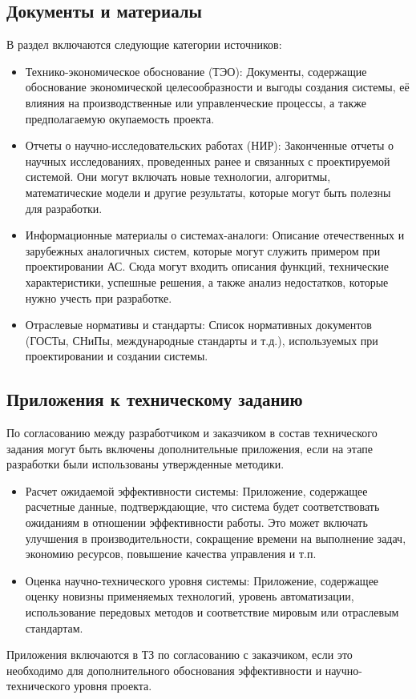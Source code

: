 \subsection{Документы и материалы}
В раздел включаются следующие категории источников:
\begin{itemize}
    \item Технико-экономическое обоснование (ТЭО): Документы, содержащие обоснование экономической целесообразности и выгоды создания системы, её влияния на производственные или управленческие процессы, а также предполагаемую окупаемость проекта.

    \item Отчеты о научно-исследовательских работах (НИР): Законченные отчеты о научных исследованиях, проведенных ранее и связанных с проектируемой системой. Они могут включать новые технологии, алгоритмы, математические модели и другие результаты, которые могут быть полезны для разработки.

    \item Информационные материалы о системах-аналоги: Описание отечественных и зарубежных аналогичных систем, которые могут служить примером при проектировании АС. Сюда могут входить описания функций, технические характеристики, успешные решения, а также анализ недостатков, которые нужно учесть при разработке.

    \item Отраслевые нормативы и стандарты: Список нормативных документов (ГОСТы, СНиПы, международные стандарты и т.д.), используемых при проектировании и создании системы.

\end{itemize}

\subsection{Приложения к техническому заданию}
По согласованию между разработчиком и заказчиком в состав технического задания могут быть включены дополнительные приложения, если на этапе разработки были использованы утвержденные методики.

\begin{itemize}
    \item Расчет ожидаемой эффективности системы: Приложение, содержащее расчетные данные, подтверждающие, что система будет соответствовать ожиданиям в отношении эффективности работы. Это может включать улучшения в производительности, сокращение времени на выполнение задач, экономию ресурсов, повышение качества управления и т.п.

    \item Оценка научно-технического уровня системы: Приложение, содержащее оценку новизны применяемых технологий, уровень автоматизации, использование передовых методов и соответствие мировым или отраслевым стандартам.

\end{itemize}

Приложения включаются в ТЗ по согласованию с заказчиком, если это необходимо для дополнительного обоснования эффективности и научно-технического уровня проекта.
